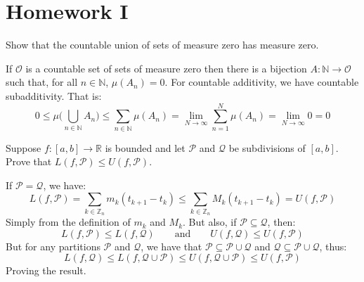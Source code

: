 \documentclass[crop=false,class=article]{standalone}                           %
\begin{document}
    \section{Homework I}
        \begin{problem}
            Show that the countable union of sets of measure zero has measure
            zero.
        \end{problem}
        \begin{solution}
            If $\mathcal{O}$ is a countable set of sets of measure zero then
            there is a bijection $A:\mathbb{N}\rightarrow\mathcal{O}$ such that,
            for all $n\in\mathbb{N}$, $\mu(A_{n})=0$. For countable additivity,
            we have countable subadditivity. That is:
            \begin{equation}
                0\leq\mu\Big(\bigcup_{n\in\mathbb{N}}A_{n}\Big)
                    \leq\sum_{n\in\mathbb{N}}\mu(A_{n})
                    =\underset{N\rightarrow\infty}{\lim}\sum_{n=1}^{N}\mu(A_{n})
                    =\underset{N\rightarrow\infty}{\lim}0
                    =0
            \end{equation}
        \end{solution}
        \begin{problem}
            Suppose $f:[a,b]\rightarrow\mathbb{R}$ is bounded and let
            $\mathcal{P}$ and $\mathcal{Q}$ be subdivisions of $[a,b]$. Prove
            that $L(f,\mathcal{P})\leq{U}(f,\mathcal{P})$.
        \end{problem}
        \begin{solution}
            If $\mathcal{P}=\mathcal{Q}$, we have:
            \begin{equation}
                    L(f,\mathcal{P})
                    =\sum_{k\in\mathbb{Z}_{n}}m_{k}(t_{k+1}-t_{k})
                        \leq\sum_{k\in\mathbb{Z}_{n}}M_{k}(t_{k+1}-t_{k})
                    =U(f,\mathcal{P})
            \end{equation}
            Simply from the definition of $m_{k}$ and $M_{k}$. But also, if
            $\mathcal{P}\subseteq\mathcal{Q}$, then:
            \begin{equation}
                L(f,\mathcal{P})\leq{L}(f,\mathcal{Q})
                \quad\quad\textrm{and}\quad\quad
                U(f,\mathcal{Q})\leq{U}(f,\mathcal{P})
            \end{equation}
            But for any partitions $\mathcal{P}$ and $\mathcal{Q}$, we have that
            $\mathcal{P}\subseteq\mathcal{P}\cup\mathcal{Q}$ and
            $\mathcal{Q}\subseteq\mathcal{P}\cup\mathcal{Q}$, thus:
            \begin{equation}
                L(f,\mathcal{Q})\leq{L}(f,\mathcal{Q}\cup\mathcal{P})
                    \leq{U}(f,\mathcal{Q}\cup\mathcal{P})\leq{U}(f,\mathcal{P})
            \end{equation}
            Proving the result.
        \end{solution}
\end{document}
